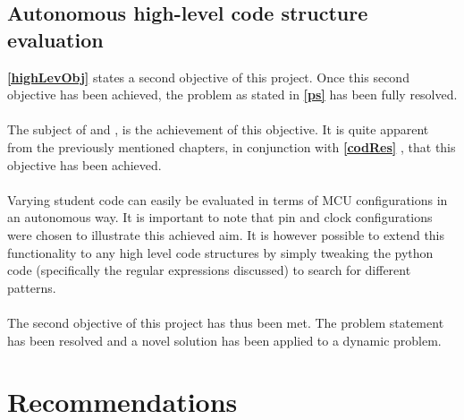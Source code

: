 \subsection{Autonomous high-level code structure evaluation}
\textbf{\ref{highLevObj} } states a second objective of this project. Once this second objective has been achieved, the problem as stated in \textbf{\ref{ps} } has been fully resolved.
\\\\
The subject of \textbf{} and \textbf{}, is the achievement of this objective. It is quite apparent from the previously mentioned chapters, in conjunction with \textbf{\ref{codRes} }, that this objective has been achieved. 
\\\\
Varying student code can easily be evaluated in terms of MCU configurations in an autonomous way. It is important to note that pin and clock configurations were chosen to illustrate this achieved aim. It is however possible to extend this functionality to any high level code structures by simply tweaking the python code (specifically the regular expressions discussed) to search for different patterns.
\\\\
The second objective of this project has thus been met. The problem statement has been resolved and a novel solution has been applied to a dynamic problem.

\section{Recommendations}

